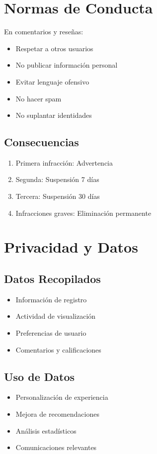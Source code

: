 \documentclass[11pt,a4paper,twoside]{book}
\begin{document}
\section{Normas de Conducta}

En comentarios y reseñas:
\begin{itemize}
    \item Respetar a otros usuarios
    \item No publicar información personal
    \item Evitar lenguaje ofensivo
    \item No hacer spam
    \item No suplantar identidades
\end{itemize}

\subsection{Consecuencias}
\begin{enumerate}
    \item Primera infracción: Advertencia
    \item Segunda: Suspensión 7 días
    \item Tercera: Suspensión 30 días
    \item Infracciones graves: Eliminación permanente
\end{enumerate}

\section{Privacidad y Datos}

\subsection{Datos Recopilados}
\begin{itemize}
    \item Información de registro
    \item Actividad de visualización
    \item Preferencias de usuario
    \item Comentarios y calificaciones
\end{itemize}

\subsection{Uso de Datos}
\begin{itemize}
    \item Personalización de experiencia
    \item Mejora de recomendaciones
    \item Análisis estadísticos
    \item Comunicaciones relevantes
\end{itemize}
\end{document}
